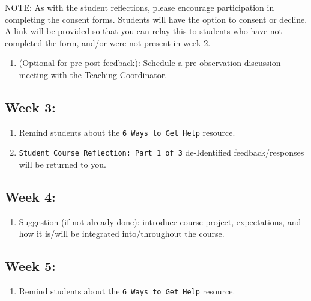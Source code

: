 \documentclass[
]{book}
\providecommand{\tightlist}{%
  \setlength{\itemsep}{0pt}\setlength{\parskip}{0pt}}
\begin{document}
NOTE: As with the student reflections, please encourage participation in completing the consent forms. Students will have the option to consent or decline. A link will be provided so that you can relay this to students who have not completed the form, and/or were not present in week 2.

\begin{enumerate}
\def\labelenumi{\arabic{enumi})}
\setcounter{enumi}{3}
\tightlist
\item
  (Optional for pre-post feedback): Schedule a pre-observation discussion meeting with the Teaching Coordinator.
\end{enumerate}

\hypertarget{week-3}{%
\subsection{Week 3:}\label{week-3}}

\begin{enumerate}
\def\labelenumi{\arabic{enumi})}
\item
  Remind students about the \texttt{6\ Ways\ to\ Get\ Help} resource.
\item
  \texttt{Student\ Course\ Reflection:\ Part\ 1\ of\ 3} de-Identified feedback/responses will be returned to you.
\end{enumerate}

\hypertarget{week-4}{%
\subsection{Week 4:}\label{week-4}}

\begin{enumerate}
\def\labelenumi{\arabic{enumi})}
\tightlist
\item
  Suggestion (if not already done): introduce course project, expectations, and how it is/will be integrated into/throughout the course.
\end{enumerate}

\hypertarget{week-5}{%
\subsection{Week 5:}\label{week-5}}

\begin{enumerate}
\def\labelenumi{\arabic{enumi})}
\tightlist
\item
  Remind students about the \texttt{6\ Ways\ to\ Get\ Help} resource.
\end{enumerate}
\end{document}

